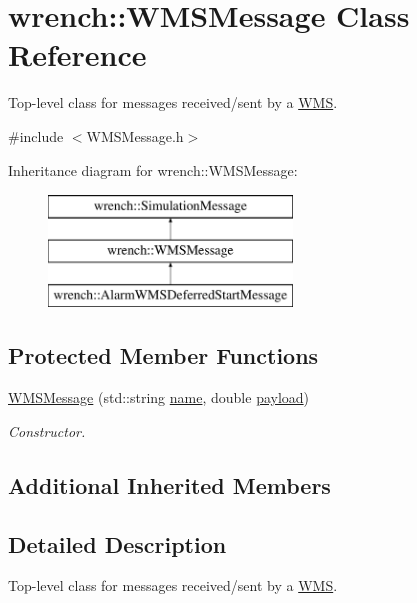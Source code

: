 \hypertarget{classwrench_1_1_w_m_s_message}{}\section{wrench\+:\+:W\+M\+S\+Message Class Reference}
\label{classwrench_1_1_w_m_s_message}


Top-\/level class for messages received/sent by a \hyperlink{classwrench_1_1_w_m_s}{W\+MS}.  




{\ttfamily \#include $<$W\+M\+S\+Message.\+h$>$}

Inheritance diagram for wrench\+:\+:W\+M\+S\+Message\+:\begin{figure}[H]
\begin{center}
\leavevmode
\includegraphics[height=3.000000cm]{classwrench_1_1_w_m_s_message}
\end{center}
\end{figure}
\subsection*{Protected Member Functions}
\begin{DoxyCompactItemize}
\item 
\hyperlink{classwrench_1_1_w_m_s_message_a8f1c6f474a31ab8cb53b579bd48eed27}{W\+M\+S\+Message} (std\+::string \hyperlink{classwrench_1_1_simulation_message_ab224f6dd8ec5ee2e7f65bfcdf2b8a86b}{name}, double \hyperlink{classwrench_1_1_simulation_message_a914f2732713f7c02898e66f05a7cb8a1}{payload})
\begin{DoxyCompactList}\small\item\em Constructor. \end{DoxyCompactList}\end{DoxyCompactItemize}
\subsection*{Additional Inherited Members}


\subsection{Detailed Description}
Top-\/level class for messages received/sent by a \hyperlink{classwrench_1_1_w_m_s}{W\+MS}. 

